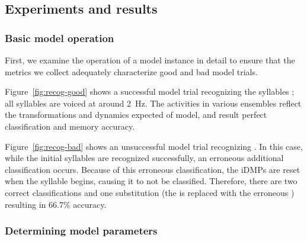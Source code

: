 \subsection{Experiments and results}

\subsubsection{Basic model operation}

First, we examine the operation
of a model instance in detail
to ensure that the metrics we collect
adequately characterize
good and bad model trials.

Figure~\ref{fig:recog-good} shows
a successful model trial
recognizing the syllables
;
all syllables are voiced
at around 2~Hz.
The activities in various ensembles
reflect the transformations
and dynamics expected of model,
and result
perfect classification and memory accuracy.



Figure~\ref{fig:recog-bad}
shows an unsuccessful model trial
recognizing .
In this case, while the initial
\ipa{[blA ti]} syllables
are recognized successfully,
an erroneous additional
\ipa{[ti]} classification occurs.
Because of this erroneous classification,
the iDMPs are reset when
the \ipa{[dAs]} syllable begins,
causing it to not be classified.
Therefore, there are two correct
classifications and one substitution
(the \ipa{[dAs]} is replaced with the
erroneous \ipa{[ti]})
resulting in 66.7\% accuracy.

\subsubsection{Determining model parameters}

